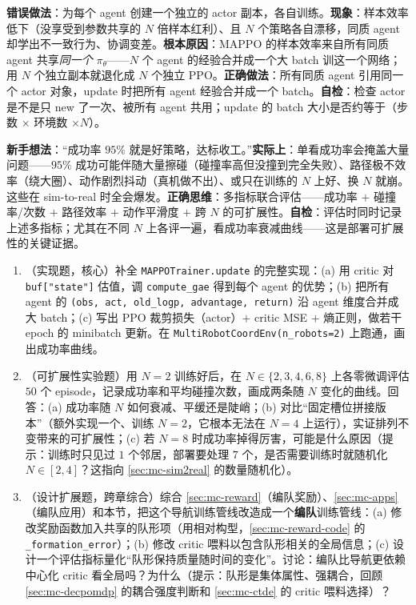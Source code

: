 \begin{pitfall}
\textbf{错误做法}：为每个 agent 创建一个独立的 actor 副本，各自训练。\textbf{现象}：样本效率低下（没享受到参数共享的 $N$ 倍样本红利）、且 $N$ 个策略各自漂移，同质 agent 却学出不一致行为、协调变差。\textbf{根本原因}：MAPPO 的样本效率来自所有同质 agent 共享\emph{同一个} $\pi_\theta$——$N$ 个 agent 的经验合并成一个大 batch 训这一个网络；用 $N$ 个独立副本就退化成 $N$ 个独立 PPO。\textbf{正确做法}：所有同质 agent 引用同一个 actor 对象，update 时把所有 agent 经验合并成一个 batch。\textbf{自检}：检查 actor 是不是只 new 了一次、被所有 agent 共用；update 的 batch 大小是否约等于（步数 $\times$ 环境数 $\times N$）。
\end{pitfall}

\begin{pitfall}
\textbf{新手想法}：“成功率 $95\%$ 就是好策略，达标收工。”\textbf{实际上}：单看成功率会掩盖大量问题——$95\%$ 成功可能伴随大量擦碰（碰撞率高但没撞到完全失败）、路径极不效率（绕大圈）、动作剧烈抖动（真机做不出）、或只在训练的 $N$ 上好、换 $N$ 就崩。这些在 sim-to-real 时全会爆发。\textbf{正确思维}：多指标联合评估——成功率 $+$ 碰撞率/次数 $+$ 路径效率 $+$ 动作平滑度 $+$ 跨 $N$ 的可扩展性。\textbf{自检}：评估时同时记录上述多指标；尤其在不同 $N$ 上各评一遍，看成功率衰减曲线——这是部署可扩展性的关键证据。
\end{pitfall}

\begin{practice}
\begin{enumerate}
  \item （实现题，核心）补全 \verb|MAPPOTrainer.update| 的完整实现：(a) 用 critic 对 \verb|buf["state"]| 估值，调 \verb|compute_gae| 得到每个 agent 的优势；(b) 把所有 agent 的 \verb|(obs, act, old_logp, advantage, return)| 沿 agent 维度合并成大 batch；(c) 写出 PPO 裁剪损失（actor）$+$ critic MSE $+$ 熵正则，做若干 epoch 的 minibatch 更新。在 \verb|MultiRobotCoordEnv(n_robots=2)| 上跑通，画出成功率曲线。
  \item （可扩展性实验题）用 $N{=}2$ 训练好后，在 $N\in\{2,3,4,6,8\}$ 上各零微调评估 $50$ 个 episode，记录成功率和平均碰撞次数，画成两条随 $N$ 变化的曲线。回答：(a) 成功率随 $N$ 如何衰减、平缓还是陡峭；(b) 对比“固定槽位拼接版本”（额外实现一个、训练 $N{=}2$，它根本无法在 $N{=}4$ 上运行），实证排列不变带来的可扩展性；(c) 若 $N{=}8$ 时成功率掉得厉害，可能是什么原因（提示：训练时只见过 $1$ 个邻居，部署要处理 $7$ 个，是否需要训练时就随机化 $N\in[2,4]$？这指向 \cref{sec:mc-sim2real} 的数量随机化）。
  \item （设计扩展题，跨章综合）综合 \cref{sec:mc-reward}（编队奖励）、\cref{sec:mc-apps}（编队应用）和本节，把这个导航训练管线改造成一个\textbf{编队}训练管线：(a) 修改奖励函数加入共享的队形项（用相对构型，\cref{sec:mc-reward-code} 的 \verb|_formation_error|）；(b) 修改 critic 喂料以包含队形相关的全局信息；(c) 设计一个评估指标量化“队形保持质量随时间的变化”。讨论：编队比导航更依赖中心化 critic 看全局吗？为什么（提示：队形是集体属性、强耦合，回顾 \cref{sec:mc-decpomdp} 的耦合强度判断和 \cref{sec:mc-ctde} 的 critic 喂料选择）？
\end{enumerate}
\end{practice}

